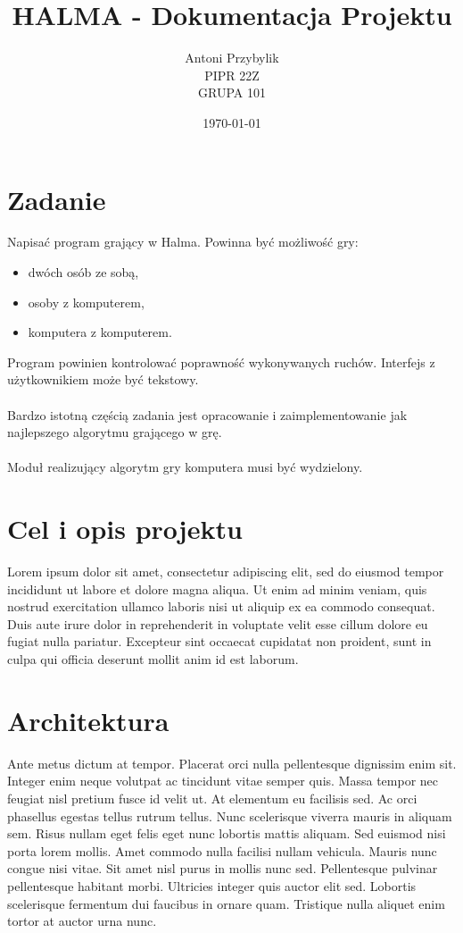 \documentclass[12pt, titlepage]{article}
\author{Antoni Przybylik\\ PIPR 22Z\\ GRUPA 101}
\date{\today}
\title{HALMA - Dokumentacja Projektu}
\begin{document}
\maketitle
\justifying

\section{Zadanie}
Napisać program grający w Halma. Powinna być możliwość gry:

\begin{itemize}
\item dwóch osób ze sobą,
\item osoby z komputerem,
\item komputera z komputerem.
\end{itemize}

\noindent
Program powinien kontrolować poprawność wykonywanych ruchów. Interfejs z użytkownikiem może być tekstowy.
\\~\\
Bardzo istotną częścią zadania jest opracowanie i zaimplementowanie jak najlepszego algorytmu grającego w grę.
\\~\\
Moduł realizujący algorytm gry komputera musi być wydzielony.

\section{Cel i opis projektu}
Lorem ipsum dolor sit amet, consectetur adipiscing elit, sed do eiusmod tempor incididunt ut labore et dolore magna aliqua. Ut enim ad minim veniam, quis nostrud exercitation ullamco laboris nisi ut aliquip ex ea commodo consequat. Duis aute irure dolor in reprehenderit in voluptate velit esse cillum dolore eu fugiat nulla pariatur. Excepteur sint occaecat cupidatat non proident, sunt in culpa qui officia deserunt mollit anim id est laborum.

\section{Architektura}
Ante metus dictum at tempor. Placerat orci nulla pellentesque dignissim enim sit. Integer enim neque volutpat ac tincidunt vitae semper quis. Massa tempor nec feugiat nisl pretium fusce id velit ut. At elementum eu facilisis sed. Ac orci phasellus egestas tellus rutrum tellus. Nunc scelerisque viverra mauris in aliquam sem. Risus nullam eget felis eget nunc lobortis mattis aliquam. Sed euismod nisi porta lorem mollis. Amet commodo nulla facilisi nullam vehicula. Mauris nunc congue nisi vitae. Sit amet nisl purus in mollis nunc sed. Pellentesque pulvinar pellentesque habitant morbi. Ultricies integer quis auctor elit sed. Lobortis scelerisque fermentum dui faucibus in ornare quam. Tristique nulla aliquet enim tortor at auctor urna nunc.
\end{document}
